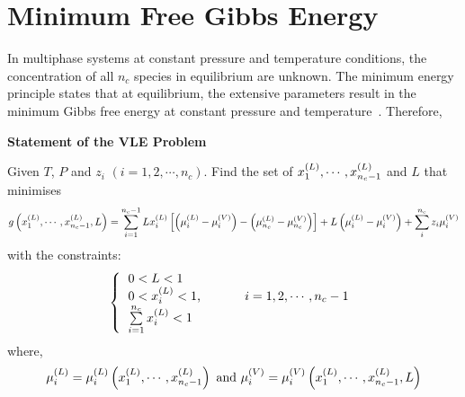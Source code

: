 \section{Minimum Free Gibbs Energy}\label{Chapter:ThermodynamicFormulation:Section:MinimumGibbsEnergy}
In multiphase systems at constant pressure and temperature conditions, the concentration of all $n_{c}$ species in equilibrium are unknown. The minimum energy principle states that at equilibrium, the extensive parameters result in the minimum Gibbs free energy at constant pressure and temperature~\citep{Callen_Book}. Therefore,  

\begin{shaded}
   \begin{center}
     {\bf Statement of the VLE Problem}
   \end{center}

   Given $T$, $P$ and $z_{i}$ $\left(i=1,2,\cdots,n_{c}\right)$. Find the set of $\mfr[x]{1}{L},\cdots,\mfr[x]{n_{c}-1}{L}$ and $L$ that minimises
   \begin{displaymath}
      g\left(\mfr[x]{1}{L},\cdots,\mfr[x]{n_{c}-1}{L}, L\right) = \summation_{i=1}^{n_{c}-1}L\mfr[x]{i}{L}\left[\left(\mfr[\mu]{i}{L}-\mfr[\mu]{i}{V}\right)-\left(\mfr[\mu]{n_{c}}{L}-\mfr[\mu]{n_{c}}{V}\right)\right] + L\left(\mfr[\mu]{i}{L}-\mfr[\mu]{i}{V}\right) + \summation_{i}^{n_{c}}z_{i}\mfr[\mu]{i}{V} 
   \end{displaymath}
   with the constraints:
\[ 
\left\{
  \begin{tabular}{l}
  $0 < L < 1$ \\
  $0 < \mfr[x]{i}{L} < 1$, \hspace{1cm} $i=1,2,\cdots,n_{c}-1$\\
  $\summation_{i=1}^{n_{c}}\mfr[x]{i}{L} < 1$\\ 
  \end{tabular}
\right.
\]
where,
\begin{displaymath}
   \mfr[\mu]{i}{L}=\mfr[\mu]{i}{L}\left(\mfr[x]{1}{L},\cdots,\mfr[x]{n_{c}-1}{L}\right)\text{ and }\mfr[\mu]{i}{V}=\mfr[\mu]{i}{V}\left(\mfr[x]{1}{L},\cdots,\mfr[x]{n_{c}-1}{L}, L\right)
\end{displaymath}

\end{shaded}
